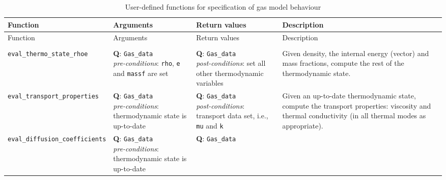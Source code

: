 \begin{landscape}
\begin{center}
\setlength{\LTcapwidth}{15cm}
\begin{longtable}{p{5.5cm}p{4.5cm}p{4.5cm}p{6.5cm}}
\caption{User-defined functions for specification of gas model behaviour \label{tab:user-defined-gas-model}}\\
\hline \hline Function & Arguments & Return values & Description \\ \hline
\endfirsthead
\hline \hline Function & Arguments & Return values & Description \\ \hline
\endhead
\hline
\endfoot
\multicolumn{4}{c}{\emph{Mandatory functions}} \\
\texttt{eval\_thermo\_state\_rhoe} & \raggedright{\textbf{Q}: \texttt{Gas\_data} \\
                                                  \textit{pre-conditions}: \texttt{rho}, \texttt{e} and \texttt{massf} are set}
                                   & \raggedright{\textbf{Q}: \texttt{Gas\_data} \\
                                                  \textit{post-conditions}: set all other thermodynamic variables} 
                                   &   Given density, the internal energy (vector) and mass fractions,
                                       compute the rest of the thermodynamic state. \\
\texttt{eval\_transport\_properties} & \raggedright{\textbf{Q}: \texttt{Gas\_data} \\
                                                   \textit{pre-conditions}: thermodynamic state is up-to-date} 
                                    & \raggedright{\textbf{Q}: \texttt{Gas\_data} \\
                                                   \textit{post-conditions}: transport data set, i.e., \texttt{mu} and
                                                   \texttt{k}}
                                    & Given an up-to-date thermodynamic state, compute the transport properties:
                                      viscosity and thermal conductivity (in all thermal modes as appropriate). \\
\texttt{eval\_diffusion\_coefficients} & \raggedright{\textbf{Q}: \texttt{Gas\_data} \\
                                                      \textit{pre-conditions}: thermodynamic state is up-to-date} 
                                       & \raggedright{\textbf{Q}: \texttt{Gas\_data} \\
}
\end{longtable}
\end{center}
\end{landscape}
